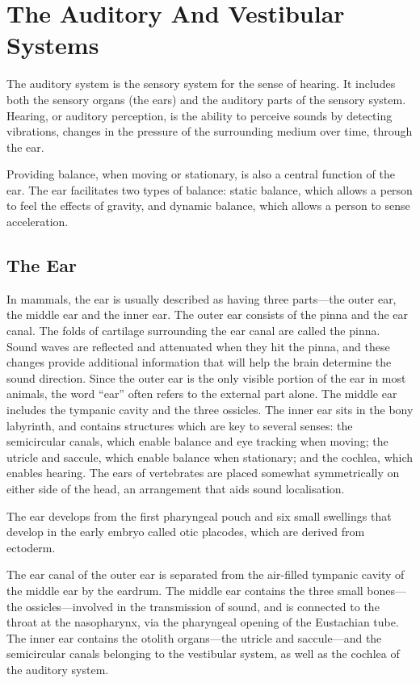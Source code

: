 \hypertarget{the-auditory-and-vestibular-systems}{%
\chapter{The Auditory And Vestibular Systems}\label{the-auditory-and-vestibular-systems}}

The auditory system is the sensory system for the sense of hearing. It includes both the sensory organs (the ears) and the auditory parts of the sensory system. Hearing, or auditory perception, is the ability to perceive sounds by detecting vibrations, changes in the pressure of the surrounding medium over time, through the ear.

Providing balance, when moving or stationary, is also a central function of the ear. The ear facilitates two types of balance: static balance, which allows a person to feel the effects of gravity, and dynamic balance, which allows a person to sense acceleration.

\hypertarget{the-ear}{%
\section{The Ear}\label{the-ear}}

In mammals, the ear is usually described as having three parts---the outer ear, the middle ear and the inner ear. The outer ear consists of the pinna and the ear canal. The folds of cartilage surrounding the ear canal are called the pinna. Sound waves are reflected and attenuated when they hit the pinna, and these changes provide additional information that will help the brain determine the sound direction. Since the outer ear is the only visible portion of the ear in most animals, the word ``ear'' often refers to the external part alone. The middle ear includes the tympanic cavity and the three ossicles. The inner ear sits in the bony labyrinth, and contains structures which are key to several senses: the semicircular canals, which enable balance and eye tracking when moving; the utricle and saccule, which enable balance when stationary; and the cochlea, which enables hearing. The ears of vertebrates are placed somewhat symmetrically on either side of the head, an arrangement that aids sound localisation.

The ear develops from the first pharyngeal pouch and six small swellings that develop in the early embryo called otic placodes, which are derived from ectoderm.

The ear canal of the outer ear is separated from the air-filled tympanic cavity of the middle ear by the eardrum. The middle ear contains the three small bones---the ossicles---involved in the transmission of sound, and is connected to the throat at the nasopharynx, via the pharyngeal opening of the Eustachian tube. The inner ear contains the otolith organs---the utricle and saccule---and the semicircular canals belonging to the vestibular system, as well as the cochlea of the auditory system.



